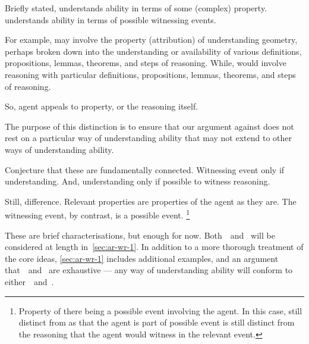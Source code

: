 \begin{note}
  Briefly stated,
  \AR{} understands ability in terms of some (complex) property.
  \WR{} understands ability in terms of possible witnessing events.

  For example, \AR{} may involve the property (attribution) of understanding geometry, perhaps broken down into the understanding or availability of various definitions, propositions, lemmas, theorems, and steps of reasoning.
  While, \WR{} would involve reasoning with particular definitions, propositions, lemmas, theorems, and steps of reasoning.

  So, agent appeals to property, or the reasoning itself.

  The purpose of this distinction is to ensure that our argument against \gESU{} does not rest on a particular way of understanding ability that may not extend to other ways of understanding ability.

  Conjecture that these are fundamentally connected.
  Witnessing event only if understanding.
  And, understanding only if possible to witness reasoning.

  Still, difference.
  Relevant properties are properties of the agent as they are.
  The witnessing event, by contrast, is a possible event.\nolinebreak
  \footnote{
    Property of there being a possible event involving the agent.
    In this case, still distinct from \WR{} as that the agent is part of possible event is still distinct from the reasoning that the agent would witness in the relevant event.
  }

  These are brief characterisations, but enough for now.
  Both~\AR{}~and~\WR{} will be considered at length in~\autoref{sec:ar-wr-1}.
  In addition to a more thorough treatment of the core ideas, \autoref{sec:ar-wr-1} includes additional examples, and an argument that~\AR{}~and~\WR{} are exhaustive --- any way of understanding ability will conform to either~\AR{}~and~\WR{}.
\end{note}

